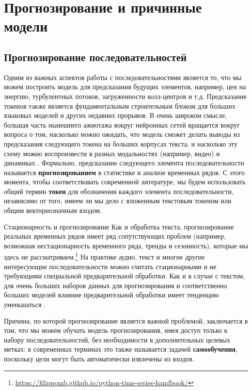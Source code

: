 \section{Прогнозирование и причинные модели}
\subsection{Прогнозирование последовательностей}

Одним из важных аспектов работы с последовательностями является то, что мы можем построить модель для предсказания будущих элементов, например, цен на энергию, турбулентных потоков, загруженности колл-центров и т.д. Предсказание токенов также является фундаментальным строительным блоком для больших языковых моделей и других недавних прорывов. В очень широком смысле, большая часть нынешнего ажиотажа вокруг нейронных сетей вращается вокруг вопроса о том, насколько можно ожидать, что модель сможет делать выводы из предсказания следующего токена на больших корпусах текста, и насколько эту схему можно воспроизвести в разных модальностях (например, видео) и динамиках \cite{wang2023scientific}. Формально, предсказание следующего элемента последовательности называется \textbf{прогнозированием} в статистике и анализе временных рядов. С этого момента, чтобы соответствовать современной литературе, мы будем использовать общий термин \textbf{токен} для обозначения каждого элемента последовательности, независимо от того, имеем ли мы дело с вложенным текстовым токеном или общим векторнозначным входом.

\begin{supportbox}{Стационарность и прогнозирование}
Как и обработка текста, прогнозирование реальных временных рядов имеет ряд сопутствующих проблем (например, возможная нестационарность временного ряда, тренды и сезонность), которые мы здесь не рассматриваем.\footnote{\url{https://filippomb.github.io/python-time-series-handbook/}} На практике аудио, текст и многие другие интересующие последовательности можно считать стационарными и не требующими специальной предварительной обработки. Как и в случае с текстом, для очень больших наборов данных для прогнозирования и соответственно больших моделей влияние предварительной обработки имеет тенденцию уменьшаться \cite{ansari2024chronos}.
\end{supportbox}

Причина, по которой прогнозирование является важной проблемой, заключается в том, что мы можем обучать модель прогнозирования, имея доступ только к набору последовательностей, без необходимости в дополнительных целевых метках: в современных терминах это также называется задачей \textbf{самообучения}, поскольку цели могут быть автоматически извлечены из входов. 

